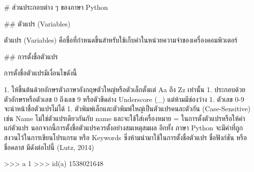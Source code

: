 \begin{markdown}

# ส่วนประกอบต่าง ๆ ของภาษา Python

## ตัวแปร (Variables)

ตัวแปร (Variables) คือชื่อที่กำหนดขึ้นสำหรับใช้เก็บค่าในหน่วยความจำของเครื่องคอมพิวเตอร์

## การตั้งชื่อตัวแปร

การตั้งชื่อตัวแปรมีเงื่อนไขดังนี้

1. ให้ขึ้นต้นด้วยอักษรตัวภาษาอังกฤษตัวใหญ่หรือตัวเล็กตั้งแต่ Aa ถึง Zz เท่านั้น 
1. ประกอบด้วยตัวอักษรหรือตัวเลข 0 ถึงเลข 9 หรือตัวขีดล่าง Underscore (_) แต่ห้ามมีช่องว่าง
1. ตัวเลข 0-9 จะนำหน้าชื่อตัวแปรไม่ได้
1. ตัวพิมพ์เล็กและตัวพิมพ์ใหญ่เป็นตัวแปรคนละตัวกัน (Case-Sensitive) เช่น Name ไม่ใช่ตัวแปรเดียวกันกับ name และจะใช้ใส่เครื่องหมาย = ในการตั้งตัวแปรหรือให้ค่าแก่ตัวแปร นอกจากนี้การตั้งชื่อตัวแปรควรตั้งอย่างสมเหตุสมผล อีกทั้ง ภาษา Python จะมีคำที่ถูกสงวนไว้ในการเขียนโปรแกรม หรือ Keywords ซึ่งห้ามนำมาใช้ในการตั้งชื่อตัวแปร ชื่อฟังก์ชัน หรือ ชื่อคลาส มีดังต่อไปนี้ (Lutz, 2014)


\end{markdown}

\begin{pycode}
>>> a
1
>>> id(a)
1538021648
\end{pycode}
